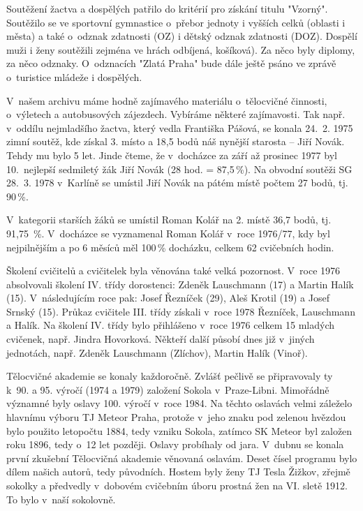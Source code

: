 \documentclass[a5paper, 11pt, twoside]{article}
\begin{document}
Soutěžení žactva a dospělých patřilo do kritérií pro získání titulu
"Vzorný". Soutěžilo se ve sportovní gymnastice o~přebor jednoty i
vyšších celků (oblasti i města) a také o~odznak zdatnosti (OZ) i dětský
odznak zdatnosti (DOZ). Dospělí muži i ženy soutěžili zejména ve hrách
odbíjená, košíková). Za něco byly diplomy, za něco odznaky. O~odznacích
"Zlatá Praha" bude dále ještě psáno ve zprávě o~turistice mládeže i
dospělých.

V~našem archivu máme hodně zajímavého materiálu o~tělocvičné činnosti,
o~výletech a autobusových zájezdech. Vybíráme některé zajímavosti. Tak
např. v~oddílu nejmladšího žactva, který vedla Františka Pášová, se
konala 24.~2. 1975 zimní soutěž, kde získal 3. místo a 18,5 bodů náš
nynější starosta -- Jiří Novák. Tehdy mu bylo 5 let. Jinde čteme, že
v~docházce za září až prosinec 1977 byl 10.~nejlepší sedmiletý žák Jiří
Novák (28 hod. = 87,5\,\%). Na obvodní soutěži SG 28.~3. 1978 v~Karlíně
se umístil Jiří Novák na pátém místě počtem 27 bodů, tj. 90\,\%.

V~kategorii starších žáků se umístil Roman Kolář na 2. místě 36,7 bodů,
tj. 91,75~\%. V~docházce se vyznamenal Roman Kolář v~roce 1976/77, kdy
byl nejpilnějším a po 6 měsíců měl 100\,\% docházku, celkem 62 cvičebních
hodin.

Školení cvičitelů a cvičitelek byla věnována také velká pozornost.
V~roce 1976 absolvovali školení IV. třídy dorostenci: Zdeněk Lauschmann
(17) a Martin Halík (15). V~následujícím roce pak: Josef Řezníček (29),
Aleš Krotil (19) a Josef Srnský (15). Průkaz cvičitele III. třídy
získali v~roce 1978 Řezníček, Lauschmann a Halík. Na školení IV. třídy
bylo přihlášeno v~roce 1976 celkem 15 mladých cvičenek, např. Jindra
Hovorková. Někteří další působí dnes již v~jiných jednotách, např.
Zdeněk Lauschmann (Zlíchov), Martin Halík (Vinoř).

Tělocvičné akademie se konaly každoročně. Zvlášť pečlivě se připravovaly
ty k~90. a 95. výročí (1974 a 1979) založení Sokola v~Praze-Libni.
Mimořádně významné byly oslavy 100. výročí v~roce 1984. Na těchto
oslavách velmi záleželo hlavnímu výboru TJ Meteor Praha, protože v~jeho
znaku pod zelenou hvězdou bylo použito letopočtu 1884, tedy vzniku
Sokola, zatímco SK Meteor byl založen roku 1896, tedy o~12 let později.
Oslavy probíhaly od jara. V~dubnu se konala první zkušební Tělocvičná
akademie věnovaná oslavám. Deset čísel programu bylo dílem našich
autorů, tedy původních. Hostem byly ženy TJ Tesla Žižkov, zřejmě sokolky
a předvedly v~dobovém cvičebním úboru prostná žen na VI. sletě 1912. To
bylo v~naší sokolovně.
\end{document}
